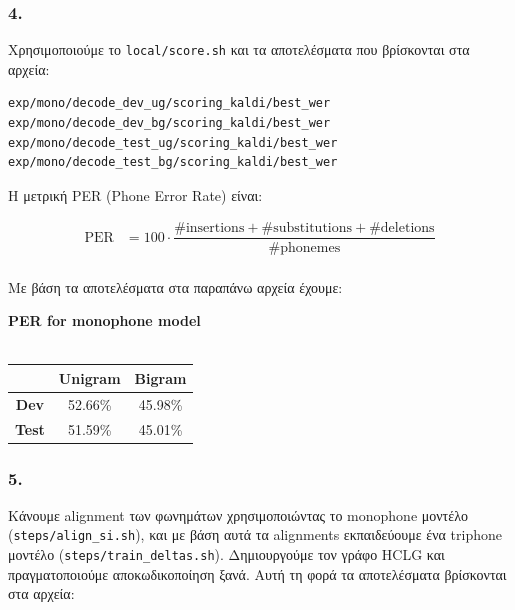 \documentclass[a4paper, 12pt]{article}
\begin{document}
        \subsubsection*{4.}
            Χρησιμοποιούμε το \verb|local/score.sh| και τα αποτελέσματα που βρίσκονται στα αρχεία:
            
            \begin{verbatim}
exp/mono/decode_dev_ug/scoring_kaldi/best_wer
exp/mono/decode_dev_bg/scoring_kaldi/best_wer
exp/mono/decode_test_ug/scoring_kaldi/best_wer
exp/mono/decode_test_bg/scoring_kaldi/best_wer
            \end{verbatim}
            
            Η μετρική PER (Phone Error Rate) είναι:
            
            \begin{align*}
                \text{PER} &= 100 \cdot \dfrac{\#\text{insertions} + \#\text{substitutions} + \#\text{deletions}}{\# \text{phonemes}} \\
            \end{align*}
            
            Με βάση τα αποτελέσματα στα παραπάνω αρχεία έχουμε:
            
            \begin{center}
                \textbf{PER for monophone model} \\~\\
                
                \begin{tabular}{|c|c|c|}
                    \hline
                                  & \textbf{Unigram}   & \textbf{Bigram} \\ \hline
                    \textbf{Dev}  & 52.66\%            & 45.98\%         \\ \hline
                    \textbf{Test} & 51.59\%            & 45.01\%         \\ \hline
                \end{tabular}    
            \end{center}
            
            
        
        \subsubsection*{5.}
            Κάνουμε alignment των φωνημάτων χρησιμοποιώντας το monophone μοντέλο (\verb|steps/align_si.sh|), και με βάση αυτά τα alignments εκπαιδεύουμε ένα triphone μοντέλο (\verb|steps/train_deltas.sh|). Δημιουργούμε τον γράφο HCLG και πραγματοποιούμε αποκωδικοποίηση ξανά. Αυτή τη φορά τα αποτελέσματα βρίσκονται στα αρχεία:
            
\end{document}
